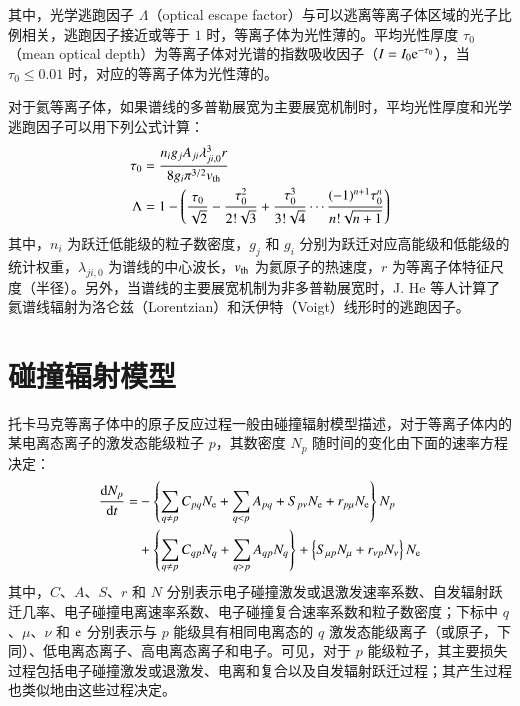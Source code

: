 其中，光学逃跑因子 $\Lambda$（optical escape factor）与可以逃离等离子体区域的光子比例相关，逃跑因子接近或等于 $1$ 时，等离子体为光性薄的。平均光性厚度 $\tau_0$（mean optical depth）为等离子体对光谱的指数吸收因子（$I=I_0{\rm e}^{-\tau_0}$），当 $\tau_0\le0.01$ 时，对应的等离子体为光性薄的。

对于氦等离子体，如果谱线的多普勒展宽为主要展宽机制时\cite{Wiese1966:book}，平均光性厚度和光学逃跑因子可以用下列公式计算\cite{Drawin1973:OEF,boivin2001}：
\begin{align}
  \tau_0&=\frac{n_ig_jA_{ji}\lambda_{ji,0}^3r}{8g_i\pi^{3/2}v_{\rm th}} \label{eq:chap02:mod}\\
  \Lambda&=1-\left(\frac{\tau_0}{\sqrt{2}}-\frac{\tau_0^2}{2!\sqrt{3}}+\frac{\tau_0^3}{3!\sqrt{4}}\cdots\frac{(-1)^{n+1}\tau_0^n}{n!\sqrt{n+1}}\right)
\end{align}
其中，$n_i$ 为跃迁低能级的粒子数密度，$g_j$ 和 $g_i$ 分别为跃迁对应高能级和低能级的统计权重，$\lambda_{ji,0}$ 为谱线的中心波长，$v_{\rm th}$ 为氦原子的热速度，$r$ 为等离子体特征尺度（半径）。另外，当谱线的主要展宽机制为非多普勒展宽时，J. He 等人\cite{HeJian2006:ef}计算了氦谱线辐射为洛仑兹（Lorentzian）和沃伊特（Voigt）线形时的逃跑因子。

\section{碰撞辐射模型}

托卡马克等离子体中的原子反应过程一般由碰撞辐射模型描述，对于等离子体内的某电离态离子的激发态能级粒子 $p$，其数密度 $N_p$ 随时间的变化由下面的速率方程决定：
\begin{equation}
\begin{aligned}
  \frac{{\rm d}N_p}{{\rm d}t}=
  &-\left\{\sum_{q\ne p}C_{pq}N_{\rm e}+\sum_{q<p}A_{pq}+S_{p\nu}N_{\rm e}+r_{p\mu}N_{\rm e}\right\}N_p\\
  &+\left\{\sum_{q\ne p}C_{qp}N_q+\sum_{q>p}A_{qp}N_q\right\}+\left\{S_{\mu p}N_{\mu}+r_{\nu p}N_\nu\right\}N_{\rm e}
\end{aligned}
\end{equation}
其中，$C$、$A$、$S$、$r$ 和 $N$ 分别表示电子碰撞激发或退激发速率系数、自发辐射跃迁几率、电子碰撞电离速率系数、电子碰撞复合速率系数和粒子数密度；下标中 $q$、$\mu$、$\nu$ 和 ${\rm e}$ 分别表示与 $p$ 能级具有相同电离态的 $q$ 激发态能级离子（或原子，下同）、低电离态离子、高电离态离子和电子。可见，对于 $p$ 能级粒子，其主要损失过程包括电子碰撞激发或退激发、电离和复合以及自发辐射跃迁过程；其产生过程也类似地由这些过程决定。

